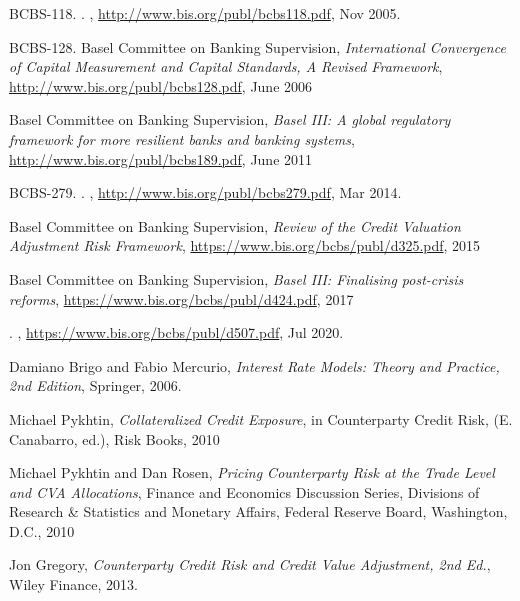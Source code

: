 \begin{thebibliography}{*}

BCBS-118.
.
,
  \url{http://www.bis.org/publ/bcbs118.pdf}, {Nov} 2005.

  BCBS-128.
  Basel Committee on Banking Supervision, {\em International Convergence of Capital Measurement and
    Capital Standards, A Revised Framework}, \url{http://www.bis.org/publ/bcbs128.pdf}, June 2006

 Basel Committee on Banking Supervision, {\em Basel III: A global regulatory framework for more
    resilient banks and banking systems}, \url{http://www.bis.org/publ/bcbs189.pdf}, June 2011

BCBS-279.
.
,
  \url{http://www.bis.org/publ/bcbs279.pdf}, {Mar} 2014.
  
  Basel Committee on Banking Supervision, {\em Review of the Credit Valuation Adjustment Risk Framework},
  \url{https://www.bis.org/bcbs/publ/d325.pdf}, 2015

  Basel Committee on Banking Supervision, {\em Basel III: Finalising post-crisis reforms},
  \url{https://www.bis.org/bcbs/publ/d424.pdf}, 2017

.
, 
  \url{https://www.bis.org/bcbs/publ/d507.pdf}, {Jul} 2020.

 Damiano Brigo and Fabio Mercurio, {\em Interest Rate Models: Theory and Practice, 2nd Edition},
  Springer, 2006.

 Michael Pykhtin, {\em Collateralized Credit Exposure}, in Counterparty Credit Risk, (E. Canabarro,
  ed.), Risk Books, 2010

 Michael Pykhtin and Dan Rosen, {\em Pricing Counterparty Risk at the Trade Level and CVA
    Allocations}, Finance and Economics Discussion Series, Divisions of Research \& Statistics and Monetary Affairs,
  Federal Reserve Board, Washington, D.C., 2010

 Jon Gregory, {\em Counterparty Credit Risk and Credit Value Adjustment, 2nd Ed.}, Wiley Finance,
  2013.


\end{thebibliography}
